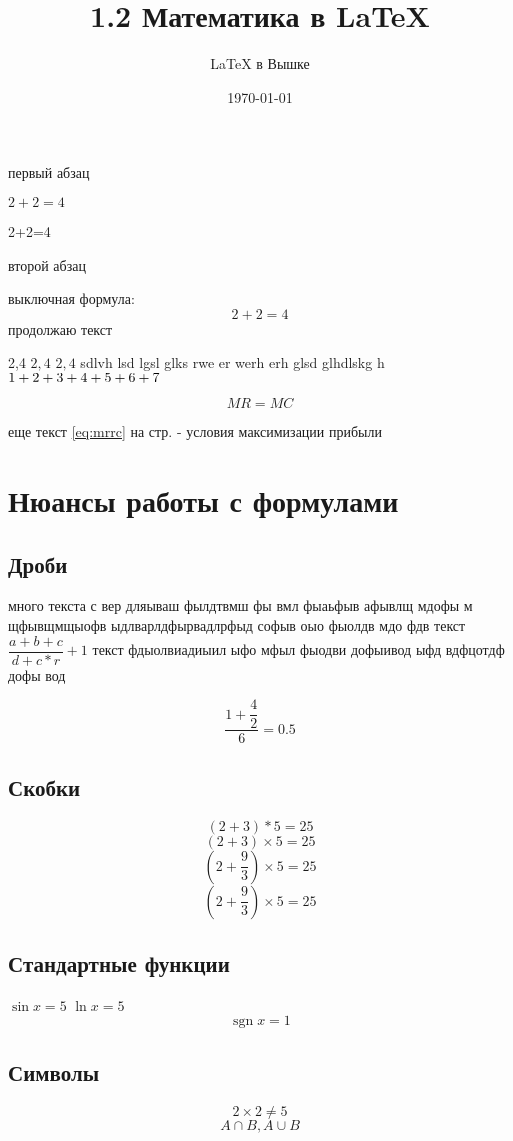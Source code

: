 \documentclass[a4paper,12pt,leqno]{article} %
\author{\LaTeX{} в Вышке}
\title{1.2 Математика в \LaTeX}
\date{\today}
\DeclareMathOperator{\sgn}{\mathop{sgn}}
\newcommand*{\hm}[1]{#1\nobreak\discretionary{}
{\hbox{$\mathsurround=0pt #1$}}{}}
\begin{document}

\maketitle

первый      абзац 


$2+2=4$


2+2=4

второй абзац

выключная формула: \[ 2+2=4 \] продолжаю текст

2,4
$2,4$ $2, 4$
 sdlvh lsd lgsl glks rwe er werh erh glsd glhdlskg h $1+2+3\hm{+}4+5+6+7$
 
\begin{equation}\label{eq:mrrc}
MR=MC
\end{equation}

еще текст
\eqref{eq:mrrc} на стр. \pageref{eq:mrrc} - условия максимизации прибыли 

\section{Нюансы работы с формулами}
\subsection{Дроби} 
много текста с вер дляываш фылдтвмш фы вмл фыаьфыв афывлщ мдофы м щфывщмщыофв
ыдлварлдфырвадлрфыд софыв оыо фыолдв мдо фдв
текст $\dfrac{a+b+c}{d+c*r}+1$ текст фдыолвиадиыил ыфо мфыл 
фыодви дофыивод ыфд вдфцотдф дофы вод 

\[\frac{1+\dfrac{4}{2}}{6}=0.5\]

\subsection{Скобки}

\[(2+3)*5=25\]
\[(2+3)\times5=25\]
\[(2+\frac{9}{3})\times5=25\]
\[\left(2+\frac{9}{3}\right)\times5=25\]


\subsection{Стандартные функции}
$\sin x =5$
$\ln x =5$
\[\sgn x =1 \]

\subsection{Символы}
\[2\times2\ne5\]
\[ A \cap B, A \cup B \]
\end{document}
